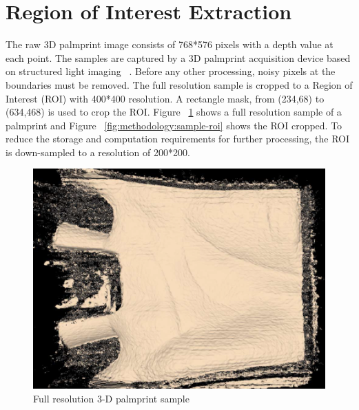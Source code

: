 \section{Region of Interest Extraction}
\label{sec:methodology:roiextraction}

The raw 3D palmprint image consists of 768*576 pixels with a depth value at each point. The samples are captured by a 3D palmprint acquisition device based on structured light imaging ~\cite{Zhang:2009dp}. Before any other processing, noisy pixels at the boundaries must be removed. The full resolution sample is cropped to a Region of Interest (ROI) with 400*400 resolution. A rectangle mask, from (234,68) to (634,468) is used to crop the ROI. Figure ~\ref{fig:methodology:sample-fullres} shows a full resolution sample of a palmprint and Figure ~\ref{fig:methodology:sample-roi} shows the ROI cropped. To reduce the storage and computation requirements for further processing, the ROI is down-sampled to a resolution of 200*200.

\begin{figure}[htb]
  \begin{center}
    \includegraphics[width=0.9\linewidth]{ch-methodology/figures/sample-fullres}
    \caption[Full resolution 3-D palmprint sample]{Full resolution 3-D palmprint sample}    \label{fig:methodology:sample-fullres}
  \end{center}
\end{figure}

